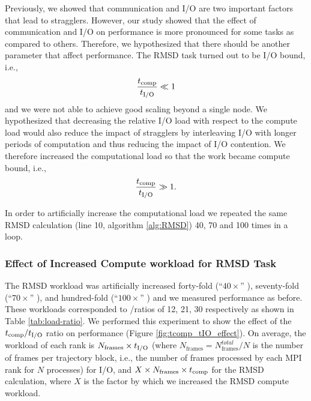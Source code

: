 Previously, we showed that communication and I/O are two important factors that lead to stragglers. 
However, our study showed that the effect of communication and I/O on performance is more pronounced for some tasks as compared to others.
Therefore, we hypothesized that there should be another parameter that affect performance.
The RMSD task turned out to be I/O bound, i.e.,
\begin{gather*}
  \frac{{t}_{\text{comp}}}{{t}_{\text{I/O}}} \ll 1
\end{gather*}
and we were not able to achieve good scaling beyond a single node. 
We hypothesized that decreasing the relative I/O load with respect to the compute load would also reduce the impact of stragglers by interleaving I/O with longer periods of computation and thus reducing the impact of I/O contention.
We therefore increased the computational load so that the work became compute bound, i.e.,
\begin{gather*}
  \frac{{t}_{\text{comp}}}{{t}_{\text{I/O}}} \gg 1.
\end{gather*}

In order to artificially increase the computational load we repeated the same RMSD calculation (line 10, algorithm \ref{alg:RMSD}) 40, 70 and 100 times in a loop.

\subsubsection{Effect of Increased Compute workload for RMSD Task}
The RMSD workload was artificially increased forty-fold (``$40\times$'' ), seventy-fold (``$70\times$'' ), and hundred-fold (``$100\times$'' ) and we measured performance as before. 
These workloads corresponded to \tcomp/\tIO ratios of 12, 21, 30 respectively as shown in Table \ref{tab:load-ratio}.
We performed this experiment to show the effect of the ${t}_{\text{comp}}/{t}_{\text{I/O}}$ ratio on performance (Figure \ref{fig:tcomp_tIO_effect}).
On average, the workload of each rank is $N_{\text{frames}} \times {t}_{\text{I/O}} $ (where $N_{\text{frames}} = N_{\text{frames}}^{total}/N$ is the number of frames per trajectory block, i.e., the number of frames processed by each MPI rank for $N$ processes) for I/O, and $X \times N_{\text{frames}} \times {t}_{\text{comp}}$ for the RMSD calculation, where $X$ is the factor by which we increased the RMSD compute workload.

